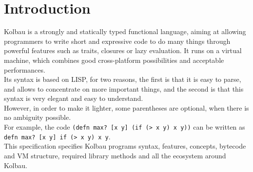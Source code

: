 \part{Introduction}
    \setcounter{page}{5}
    Kolbau is a strongly and statically typed functional language, aiming at allowing programmers to write short and expressive code to do many things through powerful features such as traits, closures or lazy evaluation. It runs on a virtual machine, which combines good cross-platform possibilities and acceptable performances. \\
    
    Its syntax is based on LISP, for two reasons, the first is that it is easy to parse, and allows to concentrate on more important things, and the second is that this syntax is very elegant and easy to understand. 
    \\ However, in order to make it lighter, some parentheses are optional, when there is no ambiguity possible. 
    \\ For example, the code \verb|(defn max? [x y] (if (> x y) x y))| can be written as \verb|defn max? [x y] if (> x y) x y|. \\
 
    This specification specifies Kolbau programs syntax, features, concepts, bytecode and VM structure, required library methods and all the ecosystem around Kolbau.

